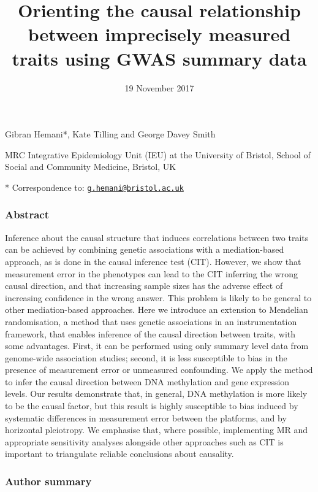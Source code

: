 \documentclass[]{article}
\title{Orienting the causal relationship between imprecisely measured traits
using GWAS summary data}
\author{}
\date{19 November 2017}
\begin{document}
\maketitle

Gibran Hemani*, Kate Tilling and George Davey Smith

MRC Integrative Epidemiology Unit (IEU) at the University of Bristol,
School of Social and Community Medicine, Bristol, UK

* Correspondence to:
\href{mailto:g.hemani@bristol.ac.uk}{\nolinkurl{g.hemani@bristol.ac.uk}}

\hypertarget{abstract}{%
\subsubsection{Abstract}\label{abstract}}

Inference about the causal structure that induces correlations between
two traits can be achieved by combining genetic associations with a
mediation-based approach, as is done in the causal inference test (CIT).
However, we show that measurement error in the phenotypes can lead to
the CIT inferring the wrong causal direction, and that increasing sample
sizes has the adverse effect of increasing confidence in the wrong
answer. This problem is likely to be general to other mediation-based
approaches. Here we introduce an extension to Mendelian randomisation, a
method that uses genetic associations in an instrumentation framework,
that enables inference of the causal direction between traits, with some
advantages. First, it can be performed using only summary level data
from genome-wide association studies; second, it is less susceptible to
bias in the presence of measurement error or unmeasured confounding. We
apply the method to infer the causal direction between DNA methylation
and gene expression levels. Our results demonstrate that, in general,
DNA methylation is more likely to be the causal factor, but this result
is highly susceptible to bias induced by systematic differences in
measurement error between the platforms, and by horizontal pleiotropy.
We emphasise that, where possible, implementing MR and appropriate
sensitivity analyses alongside other approaches such as CIT is important
to triangulate reliable conclusions about causality.

\hypertarget{author-summary}{%
\subsubsection{Author summary}\label{author-summary}}
\end{document}
